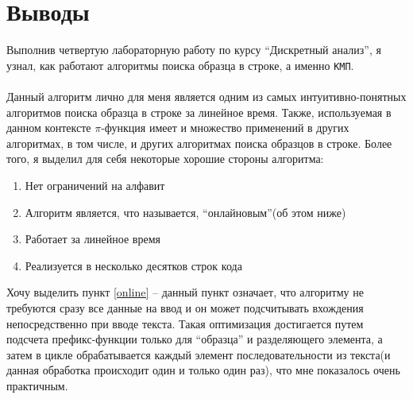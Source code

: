 \section{Выводы}

Выполнив четвертую лабораторную работу по курсу \enquote{Дискретный анализ}, 
я узнал, как работают алгоритмы поиска образца в строке, а именно \texttt{КМП}.
\\\\
Данный алгоритм лично для меня является одним из самых интуитивно-понятных алгоритмов поиска образца в строке за линейное время.
Также, используемая в данном контексте $\pi$-функция имеет и множество применений в других алгоритмах, в том числе, и других алгоритмах поиска образцов в строке.
Более того, я выделил для себя некоторые хорошие стороны алгоритма:
\begin{enumerate}
    \item Нет ограничений на алфавит
    \item \label{online}Алгоритм является, что называется, \enquote{онлайновым}(об этом ниже)
    \item Работает за линейное время
    \item Реализуется в несколько десятков строк кода
\end{enumerate}
Хочу выделить пункт \ref{online} -- данный пункт означает, что алгоритму не требуются сразу все данные на ввод и он может подсчитывать вхождения непосредственно при вводе текста.
Такая оптимизация достигается путем подсчета префикс-функции только для \enquote{образца} и разделяющего элемента,
а затем в цикле обрабатывается каждый элемент последовательности из текста(и данная обработка происходит один и только один раз),
что мне показалось очень практичным.
\pagebreak

